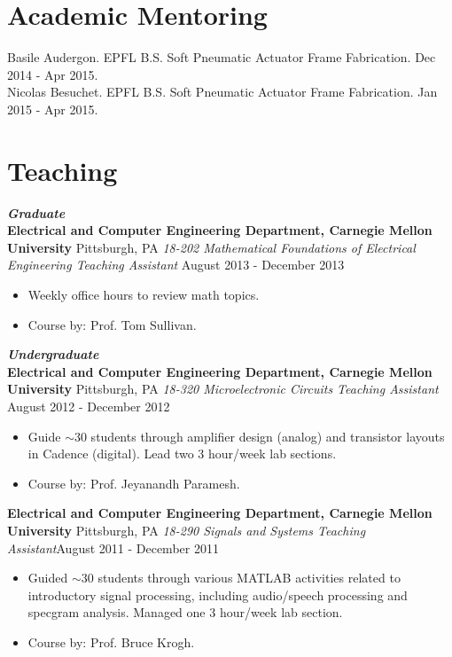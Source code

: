 \documentclass{res}
\begin{document}
\vspace{-0.1in}
\section{Academic Mentoring}
\vspace{0.05in}

Basile Audergon. EPFL B.S. Soft Pneumatic Actuator Frame Fabrication. Dec 2014 - Apr 2015.
\\Nicolas Besuchet. EPFL B.S. Soft Pneumatic Actuator Frame Fabrication. Jan 2015 - Apr 2015.


\section{Teaching}
\emph{\bf Graduate}
\\ {\bf Electrical and Computer Engineering Department, Carnegie Mellon University} \hfill Pittsburgh, PA
    \emph{18-202 Mathematical Foundations of Electrical Engineering Teaching Assistant} \hfill August 2013 - December 2013
\begin{itemize}
    \item Weekly office hours to review math topics.
    \item Course by: Prof. Tom Sullivan.
\end{itemize}     

\emph{\bf Undergraduate}
\\ {\bf Electrical and Computer Engineering Department, Carnegie Mellon University} \hfill Pittsburgh, PA
    \emph{18-320 Microelectronic Circuits Teaching Assistant} \hfill August 2012 - December 2012
\begin{itemize}
    \item Guide $\sim$30 students through amplifier design (analog) and transistor layouts in Cadence (digital). Lead two 3 hour/week lab sections. 
    \item Course by: Prof. Jeyanandh Paramesh.
\end{itemize}     

 {\bf Electrical and Computer Engineering Department, Carnegie Mellon University} \hfill Pittsburgh, PA
    \emph{18-290 Signals and Systems Teaching Assistant}\hfill August 2011 - December 2011
\begin{itemize}
    \item Guided $\sim$30 students through various MATLAB activities related to introductory signal processing, including audio/speech processing and specgram analysis. Managed one 3 hour/week lab section. 
    \item Course by: Prof. Bruce Krogh.
\end{itemize}
\end{document}
